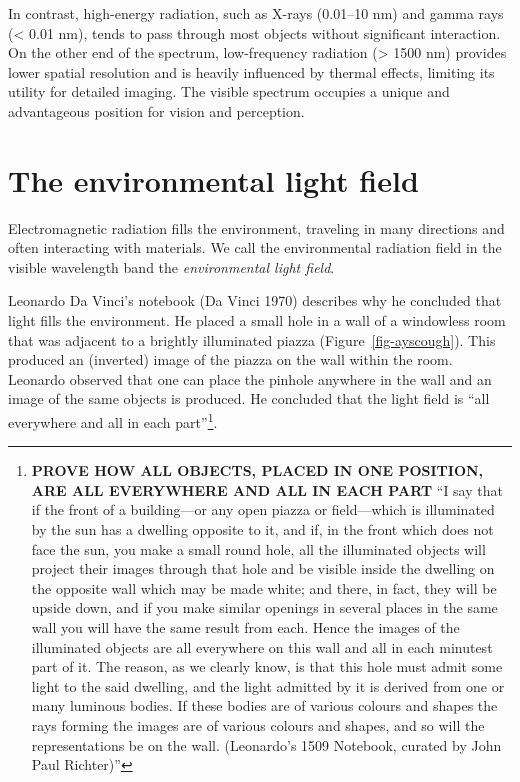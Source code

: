 \documentclass[
  letterpaper,
]{book}
\begin{document}
In contrast, high-energy radiation, such as X-rays (0.01--10 nm) and
gamma rays (\textless{} 0.01 nm), tends to pass through most objects
without significant interaction. On the other end of the spectrum,
low-frequency radiation (\textgreater{} 1500 nm) provides lower spatial
resolution and is heavily influenced by thermal effects, limiting its
utility for detailed imaging. The visible spectrum occupies a unique and
advantageous position for vision and perception.

\section{The environmental light field}\label{sec-lightfields-types}

Electromagnetic radiation fills the environment, traveling in many
directions and often interacting with materials. We call the
environmental radiation field in the visible wavelength band the
\emph{environmental light field}.

Leonardo Da Vinci's notebook (Da Vinci 1970) describes why he concluded
that light fills the environment. He placed a small hole in a wall of a
windowless room that was adjacent to a brightly illuminated piazza
(Figure~\ref{fig-ayscough}). This produced an (inverted) image of the
piazza on the wall within the room. Leonardo observed that one can place
the pinhole anywhere in the wall and an image of the same objects is
produced. He concluded that the light field is ``all everywhere and all
in each part''\footnote{\textbf{PROVE HOW ALL OBJECTS, PLACED IN ONE
  POSITION, ARE ALL EVERYWHERE AND ALL IN EACH PART} ``I say that if the
  front of a building---or any open piazza or field---which is
  illuminated by the sun has a dwelling opposite to it, and if, in the
  front which does not face the sun, you make a small round hole, all
  the illuminated objects will project their images through that hole
  and be visible inside the dwelling on the opposite wall which may be
  made white; and there, in fact, they will be upside down, and if you
  make similar openings in several places in the same wall you will have
  the same result from each. Hence the images of the illuminated objects
  are all everywhere on this wall and all in each minutest part of it.
  The reason, as we clearly know, is that this hole must admit some
  light to the said dwelling, and the light admitted by it is derived
  from one or many luminous bodies. If these bodies are of various
  colours and shapes the rays forming the images are of various colours
  and shapes, and so will the representations be on the wall.
  (Leonardo's 1509 Notebook, curated by John Paul Richter)''}.
\end{document}
